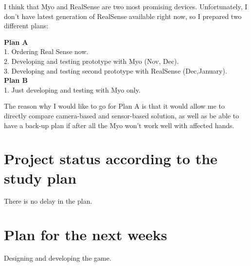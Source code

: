 \documentclass[10pt,a4paper]{article}
\begin{document}
I think that Myo and RealSense are two most promising devices. Unfortunately, I don't have latest generation of RealSense available right now, so I prepared two different plans:

\textbf{Plan A} \\
1. Ordering Real Sense now. \\ 
2. Developing and testing prototype with Myo (Nov, Dec). \\
3. Developing and testing second prototype with RealSense (Dec,January).\\

\textbf{Plan B} \\ 
1. Just developing and testing with Myo only.

The reason why I would like to go for Plan A is that it would allow me to directly compare camera-based and sensor-based solution, as well as be able to have a back-up plan if after all the Myo won't work well with affected hands. 

\section*{Project status according to the study plan}
There is no delay in the plan.

\section*{Plan for the next weeks}
Designing and developing the game.



\end{document}
